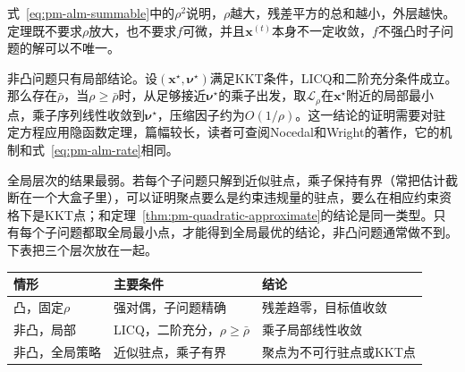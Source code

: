 式~\eqref{eq:pm-alm-summable}中的$\rho^2$说明，$\rho$越大，残差平方的总和越小，外层越快。定理既不要求$\rho$放大，也不要求$f$可微，并且$\bm{x}^{(t)}$本身不一定收敛，$f$不强凸时子问题的解可以不唯一。

非凸问题只有局部结论。设$(\bm{x}^\star,\bm{\nu}^\star)$满足KKT条件，LICQ和二阶充分条件成立。那么存在$\bar\rho$，当$\rho\geq\bar\rho$时，从足够接近$\bm{\nu}^\star$的乘子出发，取$\mathcal{L}_\rho$在$\bm{x}^\star$附近的局部最小点，乘子序列线性收敛到$\bm{\nu}^\star$，压缩因子约为$O(1/\rho)$。这一结论的证明需要对驻定方程应用隐函数定理，篇幅较长，读者可查阅Nocedal和Wright的著作，它的机制和式~\eqref{eq:pm-alm-rate}相同。

全局层次的结果最弱。若每个子问题只解到近似驻点，乘子保持有界（常把估计截断在一个大盒子里），可以证明聚点要么是约束违规量的驻点，要么在相应约束资格下是KKT点；和定理~\ref{thm:pm-quadratic-approximate}的结论是同一类型。只有每个子问题都取全局最小点，才能得到全局最优的结论，非凸问题通常做不到。下表把三个层次放在一起。

\begin{BookInlineTable}
  \centering
  \small
  \begin{tabular}{@{}lll@{}}
    \toprule
    情形 & 主要条件 & 结论\\
    \midrule
    凸，固定$\rho$ & 强对偶，子问题精确 & 残差趋零，目标值收敛\\
    非凸，局部 & LICQ，二阶充分，$\rho\geq\bar\rho$ & 乘子局部线性收敛\\
    非凸，全局策略 & 近似驻点，乘子有界 & 聚点为不可行驻点或KKT点\\
    \bottomrule
  \end{tabular}
  \caption{ALM的三层保证。下面一行不能推出上面两行的结论。}
  \label{tab:pm-alm-guarantees}
\end{BookInlineTable}
